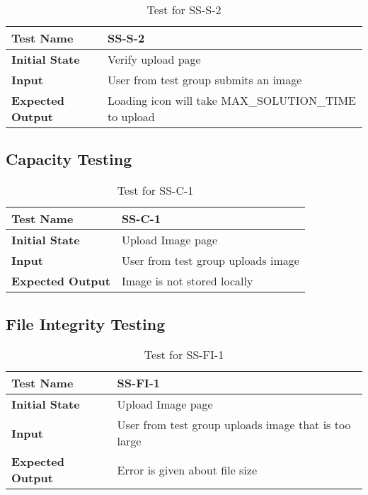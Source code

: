 \documentclass[11pt]{article}
\begin{document}
\begin{table}[H]
\centering
\begin{tabularx}{\textwidth}{p{5cm}X}
\hline
\textbf{Test Name}       &  SS-S-2\\ \hline
\textbf{Initial State}   &  Verify upload page\\ \hline
\textbf{Input}           &  User from test group submits an image\\ \hline
\textbf{Expected Output} &  Loading icon will take MAX\_SOLUTION\_TIME to upload\\ \hline
\end{tabularx}
\caption{Test for SS-S-2}
\end{table}

\subsection{Capacity Testing}
\begin{table}[H]
\centering
\begin{tabularx}{\textwidth}{p{5cm}X}
\hline
\textbf{Test Name}       &  SS-C-1\\ \hline
\textbf{Initial State}   &  Upload Image page\\ \hline
\textbf{Input}           &  User from test group uploads image\\ \hline
\textbf{Expected Output} &  Image is not stored locally\\ \hline
\end{tabularx}
\caption{Test for SS-C-1}
\end{table}

\subsection{File Integrity Testing}
\begin{table}[H]
\centering
\begin{tabularx}{\textwidth}{p{5cm}X}
\hline
\textbf{Test Name}       &  SS-FI-1\\ \hline
\textbf{Initial State}   &  Upload Image page\\ \hline
\textbf{Input}           &  User from test group uploads image that is too large\\ \hline
\textbf{Expected Output} &  Error is given about file size \\ \hline
\end{tabularx}
\caption{Test for SS-FI-1}
\end{table}
\end{document}
